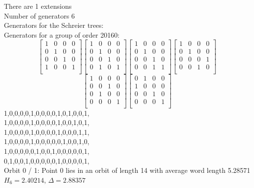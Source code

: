 There are 1 extensions\\
Number of generators 6\\
Generators for the Schreier trees:\\
{\small\arraycolsep=2pt
Generators for a group of order 20160:
$$
\left[
\begin{array}{*{4}{r}}
1 & 0 & 0 & 0\\
0 & 1 & 0 & 0\\
0 & 0 & 1 & 0\\
1 & 0 & 0 & 1\\
\end{array}
\right]
\left[
\begin{array}{*{4}{r}}
1 & 0 & 0 & 0\\
0 & 1 & 0 & 0\\
0 & 0 & 1 & 0\\
0 & 1 & 0 & 1\\
\end{array}
\right]
\left[
\begin{array}{*{4}{r}}
1 & 0 & 0 & 0\\
0 & 1 & 0 & 0\\
0 & 0 & 1 & 0\\
0 & 0 & 1 & 1\\
\end{array}
\right]
\left[
\begin{array}{*{4}{r}}
1 & 0 & 0 & 0\\
0 & 1 & 0 & 0\\
0 & 0 & 0 & 1\\
0 & 0 & 1 & 0\\
\end{array}
\right]
$$
$$
\left[
\begin{array}{*{4}{r}}
1 & 0 & 0 & 0\\
0 & 0 & 1 & 0\\
0 & 1 & 0 & 0\\
0 & 0 & 0 & 1\\
\end{array}
\right]
\left[
\begin{array}{*{4}{r}}
0 & 1 & 0 & 0\\
1 & 0 & 0 & 0\\
0 & 0 & 1 & 0\\
0 & 0 & 0 & 1\\
\end{array}
\right]
$$
1,0,0,0,0,1,0,0,0,0,1,0,1,0,0,1,\\
1,0,0,0,0,1,0,0,0,0,1,0,0,1,0,1,\\
1,0,0,0,0,1,0,0,0,0,1,0,0,0,1,1,\\
1,0,0,0,0,1,0,0,0,0,0,1,0,0,1,0,\\
1,0,0,0,0,0,1,0,0,1,0,0,0,0,0,1,\\
0,1,0,0,1,0,0,0,0,0,1,0,0,0,0,1,\\
}
\noindent Orbit 0 / 1: Point 0 lies in an orbit of length 14 with average word length 5.28571 $H_{6} = 2.40214$, $\Delta = 2.88357$\\
